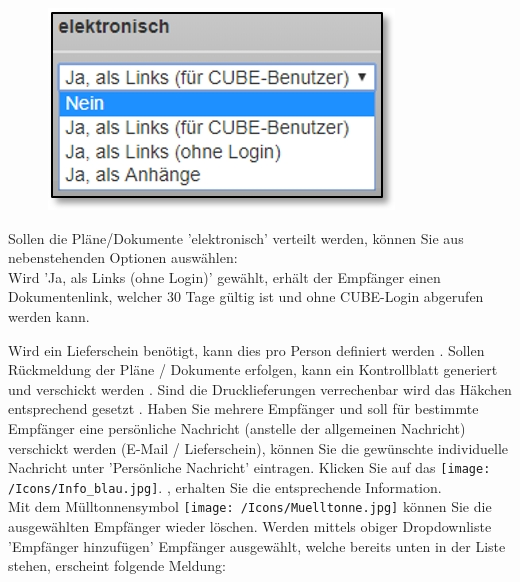 \begin{figure}   %
  \vspace{-30pt}      %
  \begin{center}
    \includegraphics[width=1\linewidth]{../chapters/11_Dokumentenablage/pictures/repro_elektronisch.jpg}
  \end{center}
  \vspace{-20pt}
  \vspace{-10pt}
\end{figure}
Sollen die Pläne/Dokumente 'elektronisch'  verteilt werden, können Sie aus nebenstehenden Optionen auswählen:\\
Wird 'Ja, als Links (ohne Login)' gewählt, erhält der Empfänger einen Dokumentenlink, welcher 30 Tage gültig ist und ohne CUBE-Login abgerufen werden kann.

\vspace{.5cm} 


Wird ein Lieferschein benötigt, kann dies pro Person definiert werden . Sollen Rückmeldung der Pläne / Dokumente erfolgen, kann ein Kontrollblatt generiert und verschickt werden . Sind die Drucklieferungen verrechenbar wird das Häkchen entsprechend gesetzt . Haben Sie mehrere Empfänger und soll für bestimmte Empfänger eine persönliche Nachricht (anstelle der allgemeinen Nachricht) verschickt werden (E-Mail / Lieferschein), können Sie die gewünschte individuelle Nachricht unter 'Persönliche Nachricht'  eintragen. Klicken Sie auf das \texttt{[image: /Icons/Info\_blau.jpg]}. , erhalten Sie die entsprechende Information.\\
Mit dem Mülltonnensymbol \texttt{[image: /Icons/Muelltonne.jpg]}  können Sie die ausgewählten Empfänger wieder löschen. Werden mittels obiger Dropdownliste 'Empfänger hinzufügen'  Empfänger ausgewählt, welche bereits unten in der Liste stehen, erscheint folgende Meldung:

